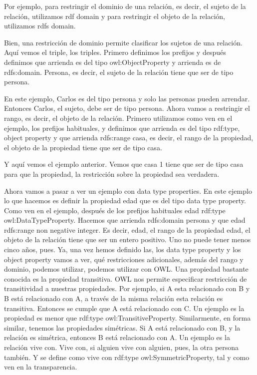 Por ejemplo, para restringir el dominio de una relación, es decir, el sujeto de la relación, utilizamos rdf domain y para restringir el objeto de la relación, utilizamos rdfs domain.

Bien, una restricción de dominio permite clasificar los sujetos de una relación. Aquí vemos el triple, los triples. Primero definimos los prefijos y después definimos que arrienda es del tipo owl:ObjectProperty y arrienda es de rdfs:domain. Persona, es decir, el sujeto de la relación tiene que ser de tipo persona.

En este ejemplo, Carlos es del tipo persona y solo las personas pueden arrendar. Entonces Carlos, el sujeto, debe ser de tipo persona. Ahora vamos a restringir el rango, es decir, el objeto de la relación. Primero utilizamos como ven en el ejemplo, los prefijos habituales, y definimos que arrienda es del tipo rdf:type, object property y que arrienda rdfs:range casa, es decir, el rango de la propiedad, el objeto de la propiedad tiene que ser de tipo casa.

Y aquí vemos el ejemplo anterior. Vemos que casa 1 tiene que ser de tipo casa para que la propiedad, la restricción sobre la propiedad sea verdadera.

Ahora vamos a pasar a ver un ejemplo con data type properties. En este ejemplo lo que hacemos es definir la propiedad edad que es del tipo data type property. Como ven en el ejemplo, después de los prefijos habituales edad rdf:type owl:DataTypeProperty. Hacemos que arrienda rdfs:domain persona y que edad rdfs:range non negative integer. Es decir, edad, el rango de la propiedad edad, el objeto de la relación tiene que ser un entero positivo. Uno no puede tener menos cinco años, pues. Ya, una vez hemos definido las, los data type property y los object property vamos a ver, qué restricciones adicionales, además del rango y dominio, podemos utilizar, podemos utilizar con OWL. Una propiedad bastante conocida es la propiedad transitiva. OWL nos permite especificar restricción de transitividad a nuestras propiedades. Por ejemplo, si A esta relacionado con B y B está relacionado con A, a través de la misma relación esta relación es transitiva. Entonces se cumple que A está relacionado con C. Un ejemplo es la propiedad es menor que rdf:type owl:TransitiveProperty. Similarmente, en forma similar, tenemos las propiedades simétricas. Si A está relacionado con B, y la relación es simétrica, entonces B está relacionado con A. Un ejemplo es la relación vive con. Vive con, si alguien vive con alguien, pues, la otra persona también. Y se define como vive con rdf:type owl:SymmetricProperty, tal y como ven en la transparencia.

